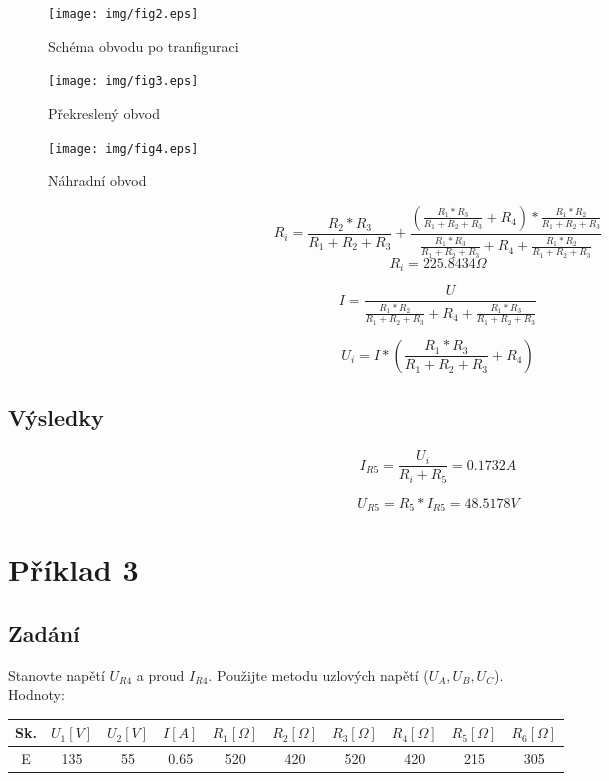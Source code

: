 \documentclass[12pt,a4paper,titlepage,final]{article}
\begin{document}
\begin{figure}[h]
  \centering
  \texttt{[image: img/fig2.eps]}
  \caption{Schéma obvodu po tranfiguraci}
  \label{fig2}
\end{figure}

\begin{figure}[h]
  \centering
  \texttt{[image: img/fig3.eps]}
  \caption{Překreslený obvod}
  \label{fig3}
\end{figure}

\begin{figure}[h]
  \centering
  \texttt{[image: img/fig4.eps]}
  \caption{Náhradní obvod}
  \label{fig4}
\end{figure}

\newcommand{\druhyRa}{\ensuremath{\frac{R_1*R_2}{R_1+ R_2 + R_3}}}
\newcommand{\druhyRb}{\ensuremath{\frac{R_2*R_3}{R_1+ R_2 + R_3}}}
\newcommand{\druhyRc}{\ensuremath{\frac{R_1*R_3}{R_1+ R_2 + R_3}}}
\begin{equation}\label{eq2:ri}
R_i = \druhyRb + \frac{(\druhyRc+R_4)*\druhyRa}{\druhyRc+R_4+\druhyRa}
\end{equation}
\[R_i = 225.8434\Omega\]

\begin{equation}\label{eq2:i}
I = \frac{U}{\druhyRa+R_4+\druhyRc}
\end{equation}

\begin{equation}\label{eq2:ui}
U_i = I*(\druhyRc+R_4)
\end{equation}
\subsection{Výsledky}
\begin{equation}\label{eq2:ir5}
I_{R5} = \frac{U_i}{R_i+R_5} = 0.1732A
\end{equation}

\begin{equation}\label{eq2:ur5}
U_{R5} = R_5 * I_{R5} = 48.5178V
\end{equation}


\section{Příklad 3}
\subsection{Zadání}
Stanovte napětí $U_{R4}$ a proud $I_{R4}$. Použijte metodu uzlových napětí ($U_A, U_B, U_C$).\\
Hodnoty:\\
\begin{tabular}{|c|c|c|c|c|c|c|c|c|c|}
\hline
Sk. & $U_1 [V]$ & $U_2[V]$ & $I[A]$ & $R_1 [\Omega]$ & $R_2 [\Omega]$ & $R_3 [\Omega]$ & $R_4 [\Omega]$ & $R_5 [\Omega]$  & $R_6 [\Omega]$\\
\hline
E & 135 & 55 & 0.65 & 520 & 420 & 520 & 420 & 215 & 305\\
\hline
\end{tabular}
\end{document}
